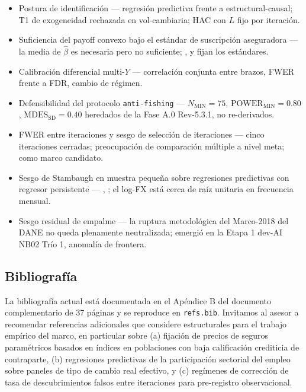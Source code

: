\documentclass[11pt,a4paper]{article}
\theoremstyle{plain}
\begin{document}
\begin{itemize}
  \item Postura de identificación --- regresión predictiva frente a estructural-causal; T1 de exogeneidad rechazada en vol-cambiaria; HAC con \(L\) fijo por iteración.
  \item Suficiencia del payoff convexo bajo el estándar de suscripción aseguradora --- la media de \(\hat{\beta}\) es necesaria pero no suficiente; \citet{carter_etal_2017}, \citet{mahul_stutley_2010} y \citet{clarke_2016} fijan los estándares.
  \item Calibración diferencial multi-\(Y\) --- correlación conjunta entre brazos, FWER frente a FDR, cambio de régimen.
  \item Defensibilidad del protocolo \texttt{anti-fishing} --- \(N_{\mathrm{MIN}}=75\), \(\mathrm{POWER}_{\mathrm{MIN}}=0.80\), \(\mathrm{MDES}_{\mathrm{SD}}=0.40\) heredados de la Fase A.0 Rev-5.3.1, no re-derivados.
  \item FWER entre iteraciones y sesgo de selección de iteraciones --- cinco iteraciones cerradas; preocupación de comparación múltiple a nivel meta; \citet{heckman_1979} como marco candidato.
  \item Sesgo de Stambaugh en muestra pequeña sobre regresiones predictivas con regresor persistente --- \citet{stambaugh1999}, \citet{phillips2014}; el log-FX está cerca de raíz unitaria en frecuencia mensual.
  \item Sesgo residual de empalme --- la ruptura metodológica del Marco-2018 del DANE no queda plenamente neutralizada; emergió en la Etapa 1 dev-AI NB02 Trío 1, anomalía de frontera.
\end{itemize}

\subsection{Bibliografía}\label{sec:4-bib}

La bibliografía actual está documentada en el Apéndice B del documento complementario de 37 páginas y se reproduce en \texttt{refs.bib}. Invitamos al asesor a recomendar referencias adicionales que considere estructurales para el trabajo empírico del marco, en particular sobre (a) fijación de precios de seguros paramétricos basados en índices en poblaciones con baja calificación crediticia de contraparte, (b) regresiones predictivas de la participación sectorial del empleo sobre paneles de tipo de cambio real efectivo, y (c) regímenes de corrección de tasa de descubrimientos falsos entre iteraciones para pre-registro observacional.
\end{document}
